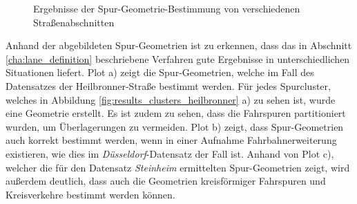 \begin{figure}[H]
    \centering
    \qquad
    \hfill
    \caption[Ergebnisse der Spur-Geometrie-Bestimmung]
            {Ergebnisse der Spur-Geometrie-Bestimmung von verschiedenen Straßenabschnitten}
    \label{fig:results_laneGeometries}
\end{figure}

Anhand der abgebildeten Spur-Geometrien ist zu erkennen, dass das in Abschnitt \ref{cha:lane_definition}
beschriebene Verfahren gute Ergebnisse in unterschiedlichen Situationen liefert.
Plot a) zeigt die Spur-Geometrien, welche im Fall des Datensatzes der Heilbronner-Straße bestimmt werden.
Für jedes Spurcluster, welches in Abbildung \ref{fig:results_clusters_heilbronner} a) zu sehen ist, wurde eine Geometrie erstellt.
Es ist zudem zu sehen, dass die Fahrspuren partitioniert wurden, um Überlagerungen zu vermeiden.
Plot b) zeigt, dass Spur-Geometrien auch korrekt bestimmt werden, wenn in einer Aufnahme
Fahrbahnerweiterung existieren, wie dies im \textit{Düsseldorf}-Datensatz der Fall ist.
Anhand von Plot c), welcher die für den Datensatz \textit{Steinheim} ermittelten Spur-Geometrien zeigt, wird
außerdem deutlich, dass auch die Geometrien kreisförmiger Fahrspuren und Kreisverkehre bestimmt werden können.

